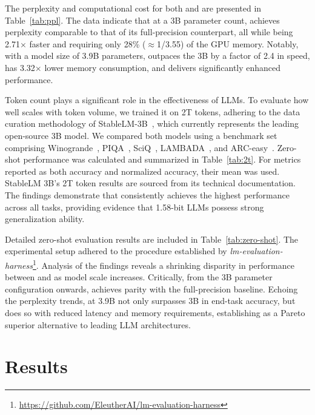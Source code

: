 The perplexity and computational cost for both  and  are presented in Table~\ref{tab:ppl}. The data indicate that at a 3B parameter count,  achieves perplexity comparable to that of its full-precision  counterpart, all while being 2.71$\times$ faster and requiring only 28\% ($\approx$1/3.55) of the GPU memory. Notably, with a model size of 3.9B parameters,  outpaces the 3B  by a factor of 2.4 in speed, has 3.32$\times$ lower memory consumption, and delivers significantly enhanced performance.

Token count plays a significant role in the effectiveness of LLMs. To evaluate how well  scales with token volume, we trained it on 2T tokens, adhering to the data curation methodology of StableLM-3B~\cite{StableLM-3B-4E1T}, which currently represents the leading open-source 3B model. We compared both models using a benchmark set comprising Winogrande~\cite{winoGrande}, PIQA~\cite{piqa}, SciQ~\cite{sciq}, LAMBADA~\cite{lambada}, and ARC-easy~\cite{arc}. Zero-shot performance was calculated and summarized in Table~\ref{tab:2t}. For metrics reported as both accuracy and normalized accuracy, their mean was used. StableLM 3B’s 2T token results are sourced from its technical documentation. The findings demonstrate that  consistently achieves the highest performance across all tasks, providing evidence that 1.58-bit LLMs possess strong generalization ability.

Detailed zero-shot evaluation results are included in Table~\ref{tab:zero-shot}. The experimental setup adhered to the procedure established by \emph{lm-evaluation-harness}\footnote{\url{https://github.com/EleutherAI/lm-evaluation-harness}}. Analysis of the findings reveals a shrinking disparity in performance between  and  as model scale increases. Critically, from the 3B parameter configuration onwards,  achieves parity with the full-precision baseline. Echoing the perplexity trends,  at 3.9B not only surpasses  3B in end-task accuracy, but does so with reduced latency and memory requirements, establishing  as a Pareto superior alternative to leading LLM architectures.

\section{Results}

